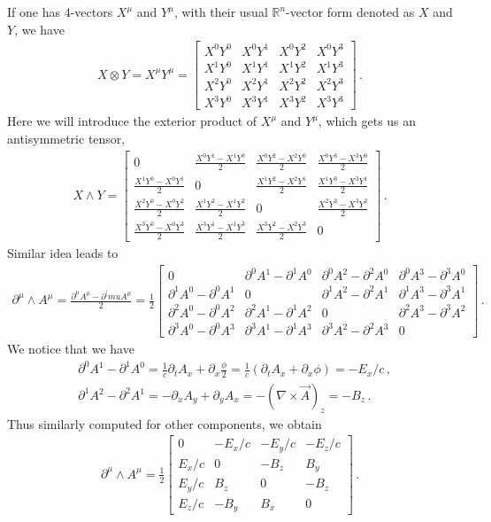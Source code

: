 \documentclass[11pt, onesided]{book}
\theoremstyle{break}
\theoremstyle{break}
\newcommand{\R}{\mathbb{R}}
\newcommand{\pd}{\partial}
\newcommand{\bmat}[1]{\begin{bmatrix} #1 \end{bmatrix}}
\begin{document}
If one has $4$-vectors $X^\mu$ and $Y^\mu$, with their usual $\R^n$-vector form denoted as $X$ and $Y$, we have
\begin{align*}
X\otimes Y = X^\mu Y^\mu = \bmat{
X^0Y^0 & X^0Y^1 & X^0Y^2 & X^0Y^3\\
X^1Y^0 & X^1Y^1 & X^1Y^2 & X^1Y^3\\
X^2Y^0 & X^2Y^1 & X^2Y^2 & X^2Y^3\\
X^3Y^0 & X^3Y^1 & X^3Y^2 & X^3Y^3
}\,.
\end{align*}
Here we will introduce the exterior product of $X^\mu$ and $Y^\mu$, which gets us an antisymmetric tensor, 
\begin{align*}
X\wedge Y = \bmat{
0 & \frac{X^0Y^1 - X^1 Y^0}{2} & \frac{X^0Y^2 - X^2Y^0}{2} & \frac{X^0Y^3-X^3Y^0}{2} \\
\frac{X^1Y^0 - X^0 Y^1}{2} & 0 & \frac{X^1Y^2 - X^2Y^1}{2} & \frac{X^1Y^3-X^3Y^1}{2}\\
\frac{X^2Y^0 - X^0 Y^2}{2} & \frac{X^1Y^2 - X^1Y^2}{2} & 0& \frac{X^2Y^3-X^3Y^2}{2}\\
\frac{X^3Y^0 - X^0 Y^3}{2} & \frac{X^3Y^1 - X^1Y^3}{2} & \frac{X^3Y^2-X^2Y^3}{2}&0
}\,.
\end{align*}
Similar idea leads to 
\begin{align*}
\pd^\mu \wedge A^\mu = \frac{\pd^\mu A^\mu - \pd^|mu A^\mu}{2} =\frac{1}{2} 
\bmat{
0& \pd^0A^1 - \pd^1 A^0 & \pd^0 A^2 - \pd^2 A^0 & \pd^0 A^3 - \pd^3 A^0\\
\pd^1A^0 - \pd^0 A^1 & 0 & \pd^1 A^2 - \pd^2 A^1 & \pd^1 A^3 - \pd^3 A^1\\
\pd^2A^0 - \pd^0A^2 & \pd^2 A^1 - \pd^1 A^2 &0 &\pd^2A^3-\pd^3A^2\\
\pd^3A^0 - \pd^0A^3 & \pd^3A^1-\pd^1A^3 & \pd^3A^2 - \pd^2 A^3 &0 
}\,.
\end{align*}
We notice that we have
\begin{align*}
&\pd^0 A^1 - \pd^1 A^0 = \frac{1}{c}\pd_t A_x + \pd_x \frac{\phi}{2} = \frac{1}{c}\left( \pd_t A_x + \pd_x \phi\right) = - E_x /c\,,\\
&\pd^1 A^2 - \pd^2 A^1 = -\pd_x A_y + \pd_yA_x = -(\nabla \times \vec{A})_z = -B_z\,.
\end{align*}
Thus similarly computed for other components, we obtain
\begin{align*}
\pd^\mu \wedge A^\mu = \frac{1}{2}
\bmat{0 & -E_x/c & -E_y /c & -E_z /c \\
E_x/c & 0 & -B_z & B_y\\
E_y/c & B_z & 0 & -B_z\\
E_z/c & -B_y & B_x & 0}\,.
\end{align*}
\end{document}
